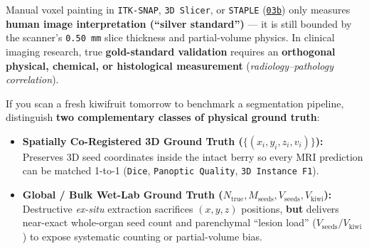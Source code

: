\documentclass[10pt,a4paper]{article}
\newcommand{\ghblob}{https://github.com/arvidl/BMED365-2027/blob/main}
\begin{document}
Manual voxel painting in \texttt{ITK-SNAP}, \texttt{3D Slicer}, or \texttt{STAPLE} (\href{\ghblob/Lab4-Comp-Imag/Kiwi-challenge/notebooks/03b-kiwi-interactive-gt-and-interrater.ipynb}{\texttt{03b}}) only measures \textbf{human image interpretation (``silver standard'')} --- it is still bounded by the scanner's \texttt{0.50\,mm} slice thickness and partial-volume physics. In clinical imaging research, true \textbf{gold-standard validation} requires an \textbf{orthogonal physical, chemical, or histological measurement} (\textit{radiology--pathology correlation}).

If you scan a fresh kiwifruit tomorrow to benchmark a segmentation pipeline, distinguish \textbf{two complementary classes of physical ground truth}:
\begin{itemize}
    \item \textbf{Spatially Co-Registered 3D Ground Truth ($\{(x_i, y_i, z_i, v_i)\}$):} Preserves 3D seed coordinates inside the intact berry so every MRI prediction can be matched 1-to-1 (\texttt{Dice}, \texttt{Panoptic Quality}, \texttt{3D Instance F1}).
    \item \textbf{Global / Bulk Wet-Lab Ground Truth ($N_{\text{true}}, M_{\text{seeds}}, V_{\text{seeds}}, V_{\text{kiwi}}$):} Destructive \textit{ex-situ} extraction sacrifices $(x, y, z)$ positions, \textbf{but} delivers near-exact whole-organ seed count and parenchymal ``lesion load'' ($V_{\text{seeds}} / V_{\text{kiwi}}$) to expose systematic counting or partial-volume bias.
\end{itemize}
\end{document}
